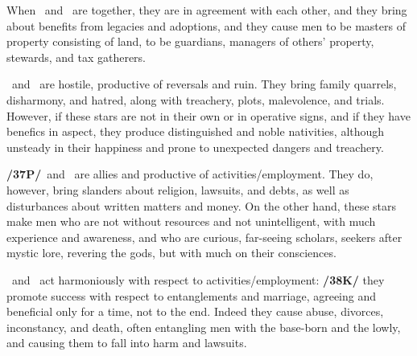 When \Saturn\, and \Jupiter\, are together, they are in agreement with each other, and they bring about benefits from legacies and adoptions, and they cause men to be masters of property consisting of land, to be guardians, managers of others’ property, stewards, and tax gatherers.

\Saturn\, and \Mars\, are hostile, productive of reversals and ruin. They bring family quarrels, disharmony, and hatred, along with treachery, plots, malevolence, and trials. However, if these stars are not in their own or in operative signs, and if they have benefics in aspect, they produce distinguished and noble nativities, although unsteady in their happiness and prone to unexpected dangers and treachery.

\textbf{/37P/}\Saturn\, and \Mercury\, are allies and productive of activities/employment. They do, however, bring slanders about religion, lawsuits, and debts, as well as disturbances about written matters and money. On the other hand, these stars make men who are not without resources and not unintelligent, with much experience and awareness, and who are curious, far-seeing scholars, seekers after mystic lore, revering the gods, but with much on their consciences.

\Saturn\, and \Venus\, act harmoniously with respect to activities/employment: \textbf{/38K/} they promote success with respect to entanglements and marriage, agreeing and beneficial only for a time, not to the end. Indeed they cause abuse, divorces, inconstancy, and death, often entangling men with the base-born and the lowly, and causing them to fall into harm and lawsuits.

